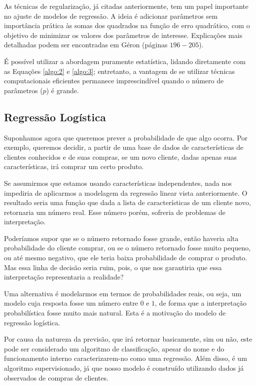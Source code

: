 As técnicas de regularização, já citadas anteriormente, tem um papel importante no ajuste de modelos de regressão. A ideia é adicionar parâmetros sem importância prática às somas dos quadrados na função de erro quadrático, com o objetivo de minimizar os valores dos parâmetros de interesse. Explicações mais detalhadas podem ser encontradas em Géron \citep{hands} (páginas $196{-}205$).

É possível utilizar a abordagem puramente estatística, lidando diretamente com as Equações \eqref{algo:2} e \eqref{algo:3}; entretanto, a vantagem de se utilizar técnicas computacionais eficientes permanece imprescindível quando o número de parâmetros ($p$) é grande.

\subsection{Regressão Logística}

Suponhamos agora que queremos prever a probabilidade de que algo ocorra. Por exemplo, queremos decidir, a partir de uma base de dados de características de clientes conhecidos e de suas compras, se um novo cliente, dadas apenas suas características, irá comprar um certo produto.

Se assumirmos que estamos usando características independentes, nada nos impediria de aplicarmos a modelagem da regressão linear vista anteriormente. O resultado seria uma função que dada a lista de características de um cliente novo, retornaria um número real. Esse número porém, sofreria de problemas de interpretação.

Poderíamos supor que se o número retornado fosse grande, então haveria alta probabilidade do cliente comprar, ou se o número retornado fosse muito pequeno, ou até mesmo negativo, que ele teria baixa probabilidade de comprar o produto. Mas essa linha de decisão seria ruim, pois, o que nos garantiria que essa interpretação representaria a realidade?

Uma alternativa é modelarmos em termos de probabilidades reais, ou seja, um modelo cuja resposta fosse um número entre $0$ e $1$, de forma que a interpretação probabilística fosse muito mais natural. Esta é a motivação do modelo de regressão logística.

Por causa da natureza da previsão, que irá retornar basicamente, sim ou não, este pode ser considerado um algoritmo de classificação, apesar do nome e do funcionamento interno	caracterizarem-no como uma regressão. Além disso, é um algoritmo supervisionado, já que nosso modelo é construído utilizando dados já observados de compras de clientes.

